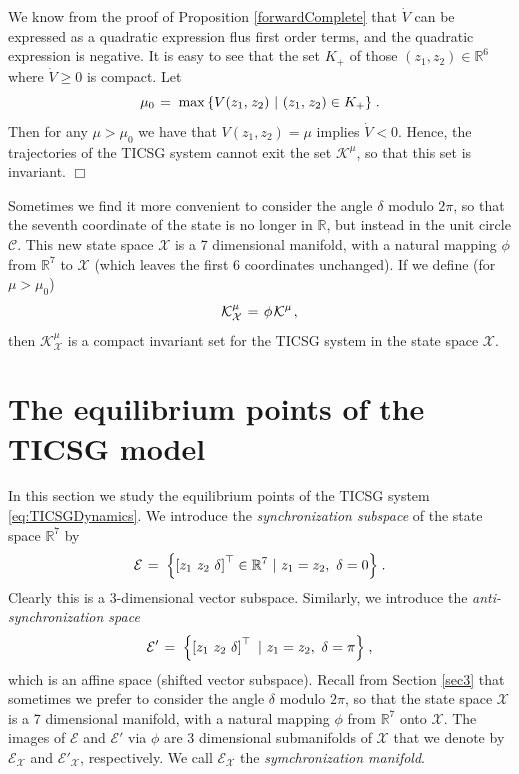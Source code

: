 \documentclass{ifacconf}
\newcommand{\rline}  {{\mathbb R}}
\newcommand{\m}      {{\hbox{\hskip 1pt}}}
\newcommand{\Cmscr}  {{\mathcal{C}}}
\newcommand{\Emscr}  {{\mathcal{E}}}
\newcommand{\Kmscr}  {{\mathcal{K}}}
\newcommand{\Xmscr}  {{\mathcal{X}}}
\begin{document}
\begin{pf} We know from the proof of Proposition 
\ref{forwardComplete} that $\dot{V}$ can be expressed as a 
quadratic expression flus first order terms, and the quadratic 
expression is negative. 
It is easy to see that the set $K_+$ of those $(z_1,z_2)\in\rline^6$ 
where $\dot V\geq 0$ is compact. Let \vspace{-1mm}
$$ \mu_0 \m=\m \max \left\{ V(z_1,\m z_2)\ |\ (z_1,\m z_2)\in K_+
   \right\} \m.$$
Then for any $\mu>\mu_0$ we have that $V(z_1,z_2)=\mu$ implies
$\dot{V}<0$. Hence, the trajectories of the TICSG system cannot exit
the set $\Kmscr^\mu$, so that this set is invariant. \m $\Box$
\end{pf}

Sometimes we find it more convenient to consider the angle $\delta$
modulo $2\pi$, so that the seventh coordinate of the state is no 
longer in $\rline$, but instead in the unit circle $\Cmscr$. This 
new state space $\Xmscr$ is a 7 dimensional manifold, with a natural
mapping $\phi$ from $\rline^7$ to $\Xmscr$ (which leaves the first 6
coordinates unchanged). If we define (for $\mu>\mu_0$)
$$\Kmscr^\mu_{\Xmscr} \m=\m \phi\m \Kmscr^\mu \m,$$
then $\Kmscr^\mu_{\Xmscr}$ is a compact invariant set for the 
TICSG system in the state space $\Xmscr$.
 
\section{The equilibrium points of the TICSG model} 
\label{sec4} %

In this section we study the equilibrium points of the TICSG
system \eqref{eq:TICSGDynamics}. We introduce the {\em synchronization 
subspace} of the state space $\rline^7$ by
\begin{equation} \label{eq:SyncSubspace}
   \Emscr \m=\m \left\{ \left[z_1 \ z_2 \ \delta \right]^\top\in
   \rline^7 \ |\ z_1=z_2,\ \delta = 0 \right\} \m.
\end{equation}
Clearly this is a 3-dimensional vector subspace. Similarly, we
introduce the {\em anti-synchronization space}
\begin{equation} \label{eq:AntiSyncSubspace}
   \Emscr' \m=\m \left\{ \left[z_1 \ z_2 \ \delta \right]^\top
   \ |\ z_1=z_2,\ \delta = \pi \right\} \m,
\end{equation}
which is an affine space (shifted vector subspace). Recall from
Section \ref{sec3} that sometimes we prefer to consider the angle
$\delta$ modulo $2\pi$, so that the state space $\Xmscr$ is a 7
dimensional manifold, with a natural mapping $\phi$ from $\rline^7$
onto $\Xmscr$. The images of $\Emscr$ and $\Emscr'$ via $\phi$ are 3
dimensional submanifolds of $\Xmscr$ that we denote by $\Emscr_\Xmscr$
and $\Emscr'_\Xmscr$, respectively. We call $\Emscr_\Xmscr$ the {\em
symchronization manifold}.
\end{document}
